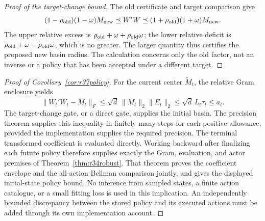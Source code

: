 \begin{proof}[Proof of the target-change bound]
The old certificate and target comparison give
\[
 (1-\rho_{\rm old})(1-\omega)M_{\rm new}
 \preceq W'W\preceq
 (1+\rho_{\rm old})(1+\omega)M_{\rm new}.
\]
The upper relative excess is $\rho_{\rm old}+\omega+
\rho_{\rm old}\omega$; the lower relative deficit is
$\rho_{\rm old}+\omega-\rho_{\rm old}\omega$, which is no greater.
The larger quantity thus certifies the proposed new basin radius. The
calculation concerns only the old factor, not an inverse or a policy that
has been accepted under a different target.
\end{proof}

\begin{proof}[Proof of Corollary~\ref{cor:r37policy}]
For the current center $\widetilde M_t$, the relative Gram enclosure yields
\[
 \|W_t'W_t-\widetilde M_t\|_F
 \leq\sqrt d\,\|\widetilde M_t\|_2\|E_t\|_2
 \leq\sqrt d\,L_t\tau_t\leq a_t.
\]
The target-change gate, or a direct gate, supplies the initial basin. The
precision theorem supplies this inequality in finitely many steps for each
positive allowance, provided the implementation supplies the required
precision. The terminal transformed coefficient is evaluated directly.
Working backward after finalizing each future policy therefore supplies
exactly the Gram, evaluation, and actor premises of
Theorem~\ref{thm:r34robust}. That theorem proves the coefficient envelope
and the all-action Bellman comparison jointly, and gives the displayed
initial-state policy bound. No inference from sampled states, a finite
action catalogue, or a small fitting loss is used in this implication.
An independently bounded discrepancy between the stored policy and its
executed actions must be added through its own implementation account.
\end{proof}
